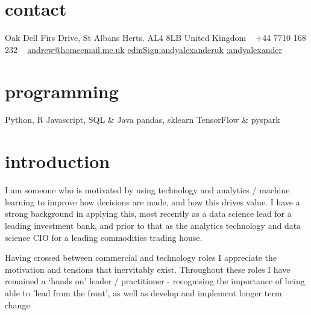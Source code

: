 \documentclass[]{friggeri-cv-a4}
\begin{document}

\usepackage{fontawesome}
\newcommand{\colorLinkedinSign}{\textcolor{rgb:red,6;green,1‌​08;blue,170}{\faLink‌​edinSign}}

\begin{aside} %
\section{contact}
Oak Dell
Firs Drive, St Albans
Herts. AL4 8LB
United Kingdom
~
+44 7710 168 232
~
\href{mailto:andrew@homeemail.me.uk}{\emailsymbol andrew@homeemail.me.uk}
\href{https://www.linkedin.com/in/andyalexanderuk}{\colorLinkedinSign:andyalexanderuk}
\href{https://github.com/andyalexander}{\faGithub:andyalexander}

\section{programming}
Python, R
Javascript, SQL \& Java
pandas, sklearn
TensorFlow \& pyspark
\end{aside}



\section{introduction}

I am someone who is motivated by using technology and analytics / machine learning to improve how decisions are made, and how this drives value.  I have a strong background in applying this, most recently as a data science lead for a leading investment bank, and prior to that as the analytics technology and data science CIO for a leading commodities trading house.

Having crossed between commercial and technology roles I appreciate the motivation and tensions that inervitably exist.  Throughout these roles I have remained a ‘hands on’ leader / practitioner - recognising the importance of being able to 'lead from the front', as well as develop and implement longer term change.
\end{document}
